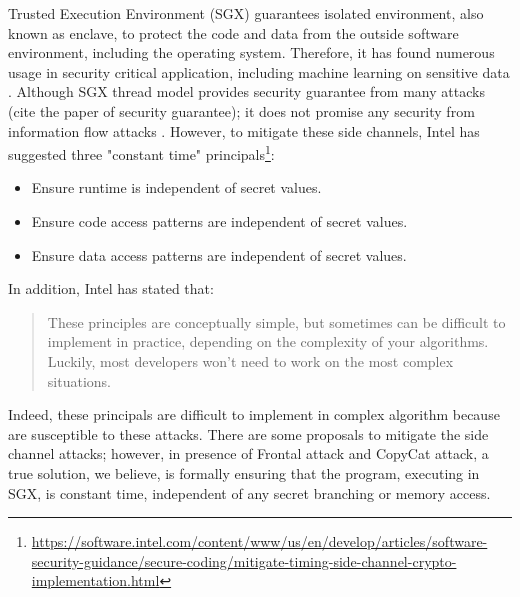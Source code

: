 \documentclass[sigplan,screen]{acmart}
\begin{document}
 
 Trusted Execution Environment (SGX) guarantees isolated environment, also known as enclave, 
 to protect the code and data from the outside software environment, including 
 the operating system. Therefore, it has found numerous usage in security 
 critical application,  including  machine learning on 
 sensitive data \cite{TB19a, kunkel2019tensorscone, hunt2018chiron, hynes2018efficient, 
 mo2021ppfl}. Although SGX thread model provides security guarantee from 
 many attacks (cite the paper of security guarantee); it does not 
 promise any security from information flow attacks \cite{xu2015controlled, 
 10.5555/3154768.3154779, moghimi2017cachezoom, gotzfried2017cache, van2017telling, 
 lee2017inferring, moghimi2020copycat, puddu2020frontal, van2018foreshadow}.
 However, to mitigate these side channels, Intel has suggested three 
 "constant time" principals\footnote{\url{https://software.intel.com/content/www/us/en/develop/articles/software-security-guidance/secure-coding/mitigate-timing-side-channel-crypto-implementation.html}}:
 \begin{itemize}
     \item Ensure runtime is independent of secret values.
    \item Ensure code access patterns are independent of secret values.
    \item Ensure data access patterns are independent of secret values.
 \end{itemize}

 \noindent
 In addition, Intel has stated that:
 \begin{quote}
    These principles are conceptually simple, but sometimes can be difficult to 
 implement in practice, depending on the complexity of your algorithms. Luckily, 
 most developers won’t need to work on the most complex situations.    
 \end{quote}
   
 Indeed, these principals are difficult to implement in complex 
 algorithm because \cite{kunkel2019tensorscone, hunt2018chiron, TB19a} are 
 susceptible to these attacks.
 There are some proposals \cite{10.1145/2897845.2897885, shih2017t, chen2017detecting} 
 to mitigate the side channel attacks; however, in presence of Frontal \cite{puddu2020frontal} attack 
 and CopyCat \cite{moghimi2020copycat}
 attack, 
 a true solution, we believe,
 is formally ensuring that the program, executing in SGX, is constant time, independent 
 of any secret branching or memory access. 
 
\end{document}
